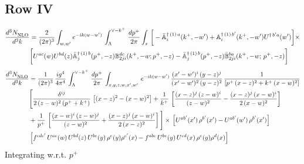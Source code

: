\documentclass[9pt]{article}
\def\mf#1{\mathbb{#1}}
\numberwithin{equation}{section}
\begin{document}
\subsection{Row IV\,}
\begin{align}
 \frac{d^{3}N_{\rm NLO}^{\rm}}{d^{3}k}  & = \frac{2}{(2\pi)^{3}}  \int_{w, w^\prime} e^{-ik(w-w^\prime)}\, \int_{\Lambda}^{\vee - k^{+}}\,\frac{dp^{+}}{2\pi} \int_{z}\,\bigg[-\bar{\mf{A}}^{\dagger\,(1)\,a}_{i}(k^{+},-w^{\prime})+\mf{A}^{\dagger\, (1)\, b^{\prime}}_{i}(k^{+},-w^{\prime})U^{\dagger\, b^{\prime}a}(w^{\prime})\bigg]\times \notag \\ & \bigg[U^{ac}(w)U^{bd}(z) \bar{\mf{A}}^{\dagger\, (1)\, b}_{j}(p^+,- z) {\mf{B}}^{dc}_{2ji} (k^+, -w;p^+, -z) - \Bar{\mf{A}}^{\dagger\, (1)\, b}_{j}(p^{+}, -z)\Bar{\mf{B}}^{ba}_{2ji}(k^{+},-w;\,p^{+}, -z) \bigg] \nonumber
\end{align}
\begin{align}
    \frac{d^{3}N_{\rm NLO}^{\rm}}{d^{3}k}  & = \frac{1}{(2\pi)^{3}}\,\frac{ig^{4}}{4\pi^{4}}\, \int_{\Lambda}^{\vee-k^{+}}\, \frac{dp^{+}}{2\pi}\, \int_{x,y,z,w,x',w'}\,e^{-ik(w-w^\prime)}\, \frac{(x'-w')^{i}\,(y-z)^{j}}{(x'-w')^{2}\,(y-z)^{2}}\, \frac{1}{\left[p^{+}\,(x-z)^{2}+k^{+}\,(x-w)^{2}\right]}\notag \\ & \Bigg[\frac{\delta^{ij}}{2\,(z-w)^{2}\,(p^{+}+k^{+})}\, \left[(x-z)^{2}-(x-w)^{2}\right]+\frac{1}{k^{+}}\,\left[\frac{(x-z)^{j}\,(z-w)^{i}}{(z-w)^{2}}-\frac{(x-z)^{j}\,(x-w)^{i}}{2\,(x-w)^{2}}\right]\notag \\ & + \frac{1}{p^{+}}\, \left[\frac{(x-w)^{i}\,(z-w)^{j}}{(z-w)^{2}}+\frac{(x-z)^{j}\,(x-w)^{i}}{2\,(x-z)^{2}}\right]\Bigg]\times\, \left[U^{ab'}(x')\,\rho^{b'}(x')-U^{ab'}(w')\,\rho^{b'}(x')\right]\notag \\ & \left[f^{cdc'}\,U^{ac}(w)\,U^{bd}(z)\,U^{be}(y)\,\rho^{e}(y)\rho^{c'}(x)-f^{abc}\,U^{be}(y)\,U^{cd}(x)\,\rho^{e}(y)\rho^{d}(x)\right] %
\end{align}
Integrating w.r.t. $p^{+}$
\end{document}
